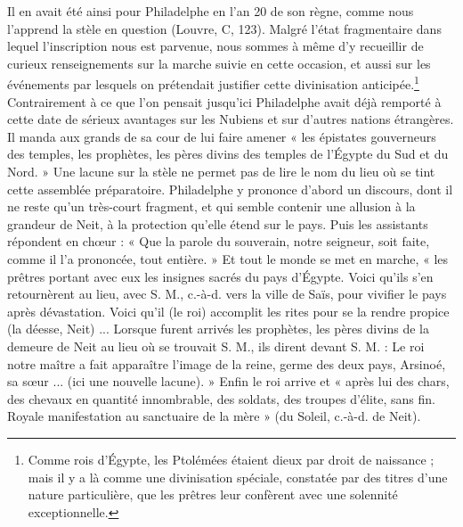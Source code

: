 \documentclass[letterpaper,twocolumn,openany,nodeprecatedcode]{dndbook}
\begin{document}
Il en avait été ainsi pour Philadelphe en l'an 20 de son règne, comme nous l'apprend la stèle en question (Louvre, C, 123). Malgré l'état fragmentaire dans lequel l'inscription nous est parvenue, nous sommes à même d'y recueillir de curieux renseignements sur la marche suivie en cette occasion, et aussi sur les événements par lesquels on prétendait justifier cette divinisation anticipée.\footnote{Comme rois d'Égypte, les Ptolémées étaient dieux par droit de naissance ; mais il y a là comme une divinisation spéciale, constatée par des titres d'une nature particulière, que les prêtres leur confèrent avec une solennité exceptionnelle.} Contrairement à ce que l'on pensait jusqu'ici Philadelphe avait déjà remporté à cette date de sérieux avantages sur les Nubiens et sur d'autres nations étrangères. Il manda aux grands de sa cour de lui faire amener « les épistates gouverneurs des temples, les prophètes, les pères divins des temples de l'Égypte du Sud et du Nord. » Une lacune sur la stèle ne permet pas de lire le nom du lieu où se tint cette assemblée préparatoire. Philadelphe y prononce d'abord un discours, dont il ne reste qu'un très-court fragment, et qui semble contenir une allusion à la grandeur de Neit, à la protection qu'elle étend sur le pays. Puis les assistants répondent en chœur : « Que la parole du souverain, notre seigneur, soit faite, comme il l'a prononcée, tout entière. » Et tout le monde se met en marche, « les prêtres portant avec eux les insignes sacrés du pays d'Égypte. Voici qu'ils s'en retournèrent au lieu, avec S. M., c.-à-d. vers la ville de Saïs, pour vivifier le pays après dévastation. Voici qu'il (le roi) accomplit les rites pour se la rendre propice (la déesse, Neit) ... Lorsque furent arrivés les prophètes, les pères divins de la demeure de Neit au lieu où se trouvait S. M., ils dirent devant S. M. : Le roi notre maître a fait apparaître l'image de la reine, germe des deux pays, Arsinoé, sa sœur ... (ici une nouvelle lacune). » Enfin le roi arrive et « après lui des chars, des chevaux en quantité innombrable, des soldats, des troupes d'élite, sans fin. Royale manifestation au sanctuaire de la mère » (du Soleil, c.-à-d. de Neit).
\end{document}

